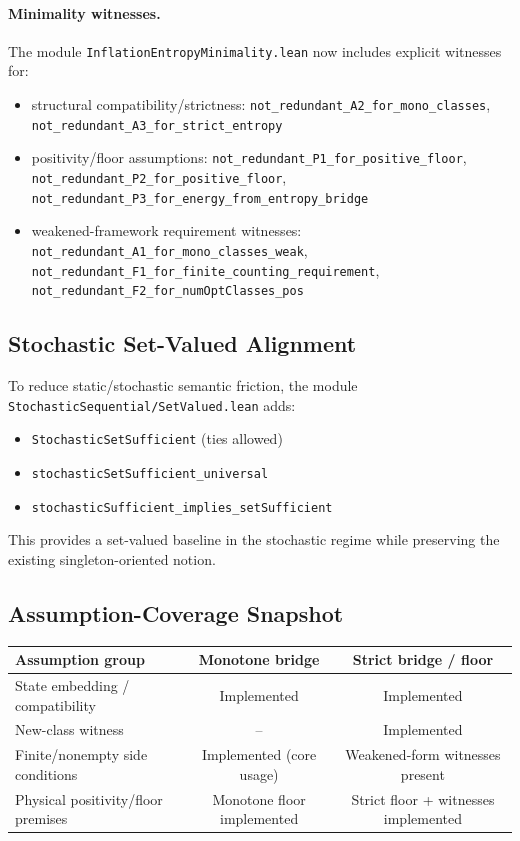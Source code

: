 \paragraph{Minimality witnesses.}
The module \texttt{InflationEntropyMinimality.lean} now includes explicit witnesses for:
\begin{itemize}
\item structural compatibility/strictness: \texttt{not\_redundant\_A2\_for\_mono\_classes}, \texttt{not\_redundant\_A3\_for\_strict\_entropy}
\item positivity/floor assumptions: \texttt{not\_redundant\_P1\_for\_positive\_floor}, \texttt{not\_redundant\_P2\_for\_positive\_floor}, \texttt{not\_redundant\_P3\_for\_energy\_from\_entropy\_bridge}
\item weakened-framework requirement witnesses: \texttt{not\_redundant\_A1\_for\_mono\_classes\_weak},
\texttt{not\_redundant\_F1\_for\_finite\_counting\_requirement},
\texttt{not\_redundant\_F2\_for\_numOptClasses\_pos}
\end{itemize}

\subsection{Stochastic Set-Valued Alignment}

To reduce static/stochastic semantic friction, the module
\texttt{StochasticSequential/SetValued.lean} adds:
\begin{itemize}
\item \texttt{StochasticSetSufficient} (ties allowed)
\item \texttt{stochasticSetSufficient\_universal}
\item \texttt{stochasticSufficient\_implies\_setSufficient}
\end{itemize}
This provides a set-valued baseline in the stochastic regime while preserving the existing singleton-oriented notion.

\subsection{Assumption-Coverage Snapshot}

\begin{center}
\begin{tabular}{lcc}
\toprule
Assumption group & Monotone bridge & Strict bridge / floor \\
\midrule
State embedding / compatibility & Implemented & Implemented \\
New-class witness & -- & Implemented \\
Finite/nonempty side conditions & Implemented (core usage) & Weakened-form witnesses present \\
Physical positivity/floor premises & Monotone floor implemented & Strict floor + witnesses implemented \\
\bottomrule
\end{tabular}
\end{center}

